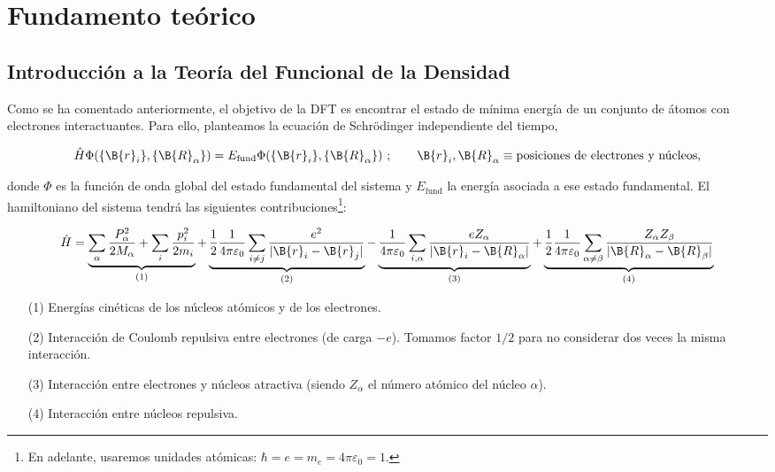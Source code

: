 \section{Fundamento teórico}

\subsection[Introducción a la DFT]{Introducción a la Teoría del Funcional de la Densidad}

Como se ha comentado anteriormente, el objetivo de la DFT es encontrar el estado de mínima energía de un conjunto de átomos con electrones interactuantes. Para ello, planteamos la ecuación de Schrödinger independiente del tiempo, 

\begin{equation}
    \hat{H} \Phi (\{ \B{r}_i \} , \{ \B{R}_\alpha \}) = E_\text{fund} \Phi (\{ \B{r}_i \} , \{ \B{R}_\alpha \}) \ ; \qquad \B{r}_i , \B{R}_\alpha \equiv \text{posiciones de electrones}  \text{ y núcleos,}
\end{equation}

donde $\Phi$ es la función de onda global del estado fundamental del sistema y $E_\text{fund}$ la energía asociada a ese estado fundamental. El hamiltoniano del sistema tendrá las siguientes contribuciones\footnote{En adelante, usaremos unidades atómicas: $\hbar = e = m_e = 4\pi \varepsilon_0 = 1$.}:

\begin{equation}
    \begin{split}
        \hat{H} = \underbrace{\sum _\alpha \frac{P_\alpha ^2}{2M_\alpha } + \sum _i \frac{p_i^2}{2m_i}}_{(1)} + \underbrace{\frac{1}{2} \frac{1}{4\pi \varepsilon_0} \sum_{i\neq j} \frac{e^2}{|\B{r}_i - \B{r}_j |}}_{(2)} - \underbrace{\frac{1}{4\pi \varepsilon_0} \sum _{i,\alpha } \frac{eZ_\alpha }{|\B{r}_i - \B{R}_\alpha |}}_{(3)} + \underbrace{\frac{1}{2} \frac{1}{4\pi \varepsilon_0} \sum_{\alpha \neq \beta } \frac{Z_\alpha Z_\beta }{|\B{R}_\alpha - \B{R}_\beta |}}_{(4)}
    \end{split}
\end{equation}  

\begin{enumerate}
    \item[(1)] Energías cinéticas de los núcleos atómicos y de los electrones. 
    \item[(2)] Interacción de Coulomb repulsiva entre electrones (de carga $-e$). Tomamos factor $1/2$ para no considerar dos veces la misma interacción.
    \item[(3)] Interacción entre electrones y núcleos atractiva (siendo $Z_\alpha $ el número atómico del núcleo $\alpha$).
    \item[(4)] Interacción entre núcleos repulsiva. 
\end{enumerate}

